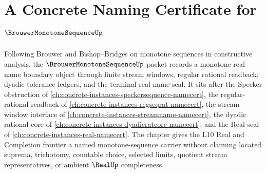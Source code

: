 \chapter{A Concrete Naming Certificate for $\BrouwerMonotoneSequenceUp$}
\label{ch:concrete-instances-brouwer-monotone-sequence-namecert}

Following Brouwer and Bishop--Bridges on monotone sequences in constructive analysis, the $\BrouwerMonotoneSequenceUp$ packet records a monotone real-name boundary object through finite stream windows, regular rational readback, dyadic tolerance ledgers, and the terminal real-name seal. It sits after the Specker obstruction of \autoref{ch:concrete-instances-speckersequence-namecert}, the regular-rational readback of \autoref{ch:concrete-instances-regseqrat-namecert}, the stream-window interface of \autoref{ch:concrete-instances-streamname-namecert}, the dyadic rational core of \autoref{ch:concrete-instances-dyadicratcore-namecert}, and the Real seal of \autoref{ch:concrete-instances-real-namecert}. The chapter gives the L10 Real and Completion frontier a named monotone-sequence carrier without claiming located suprema, trichotomy, countable choice, selected limits, quotient stream representatives, or ambient $\RealUp$ completeness.

